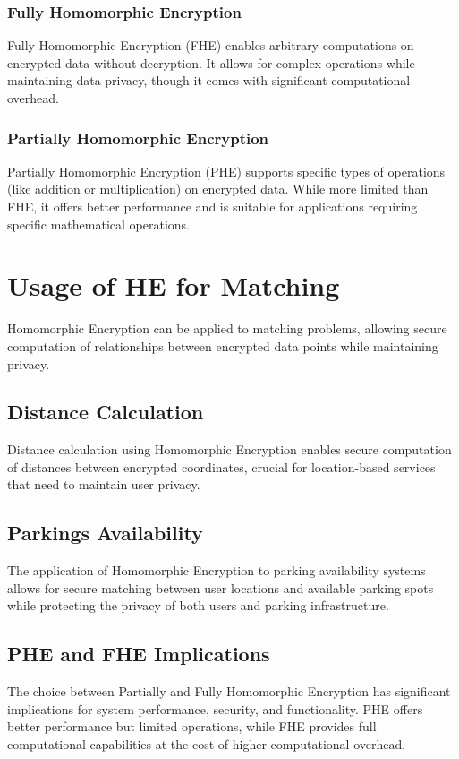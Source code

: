 \documentclass[12pt,a4paper,twoside]{book}
\begin{document}
\subsubsection{Fully Homomorphic Encryption}
Fully Homomorphic Encryption (FHE) enables arbitrary computations on encrypted data without decryption. It allows for complex operations while maintaining data privacy, though it comes with significant computational overhead.

\subsubsection{Partially Homomorphic Encryption}
Partially Homomorphic Encryption (PHE) supports specific types of operations (like addition or multiplication) on encrypted data. While more limited than FHE, it offers better performance and is suitable for applications requiring specific mathematical operations.

\section{Usage of HE for Matching}
Homomorphic Encryption can be applied to matching problems, allowing secure computation of relationships between encrypted data points while maintaining privacy.

\subsection{Distance Calculation}
Distance calculation using Homomorphic Encryption enables secure computation of distances between encrypted coordinates, crucial for location-based services that need to maintain user privacy.

\subsection{Parkings Availability}
The application of Homomorphic Encryption to parking availability systems allows for secure matching between user locations and available parking spots while protecting the privacy of both users and parking infrastructure.

\subsection{PHE and FHE Implications}
The choice between Partially and Fully Homomorphic Encryption has significant implications for system performance, security, and functionality. PHE offers better performance but limited operations, while FHE provides full computational capabilities at the cost of higher computational overhead.
\end{document}
